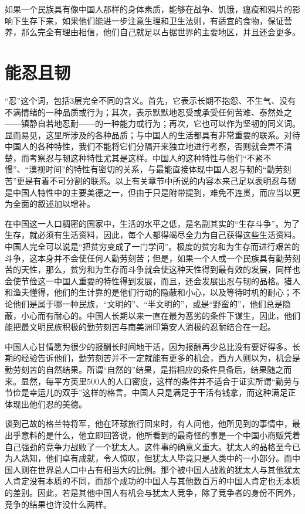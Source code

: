 \documentclass[12pt,oneside]{book}
\begin{document}
\begin{common-format}
如果一个民族具有像中国人那样的身体素质，能够在战争、饥饿，瘟疫和鸦片的影响下生存下来，如果他们能进一步注意生理和卫生法则，有适宜的食物，保证营养，那么完全有理由相信，他们自己就足以占据世界的主要地区，并且还会更多。


\chapter{能忍且韧}
“忍”这个词，包括3层完全不同的含义。首先，它表示长期不抱怨、不生气、没有不满情绪的一种品质或行为；其次，表示默默地忍受或承受任何苦难、泰然处之——镇静自若地忍耐——的一种能力或行为；再次，它也可以作为坚韧的同义词。显而易见，这里所涉及的各种品质；与中国人的生活都具有非常重要的联系。对待中国人的各种特性，我们不能将它们分隔开来独立地进行考察，否则就会弄不清楚，而考察忍与韧这种特性尤其是这样。中国人的这种特性与他们“不紧不慢”、“漠视时间”的特性有密切的关系，与最能直接体现中国人忍与韧的“勤劳刻苦”更是有着不可分割的联系。以上有关章节中所说的内容本来己足以表明忍与韧是中国人特性中的主要美德之一，但由于只是附带提到，难免不连贯，而应当以更为全面的叙述加以增补。 

在中国这一人口稠密的国家中，生活的水平之低，是名副其实的“生存斗争”。为了生存，就必须有生活资料，因此，每个人都得竭尽全力为自己获得这些生活资料。中国人完全可以说是“把贫穷变成了一门学问”。极度的贫穷和为生存而进行艰苦的斗争，这本身并不会使任何人勤劳刻苦；但是，如果一个人或一个民族具有勤劳刻苦的天性，那么，贫穷和为生存而斗争就会使这种天性得到最有效的发展，同样也会使节俭这一中国人重要的特性得到发展，而且，还会发展出忍与韧的品格。猎人和渔夫懂得，他们的生计靠的是他们行动的隐蔽和小心，以及等待时机的耐心；不论他们是属于哪一种民族，“文明的”、“半文明的”，或是“野蛮的”，他们总是隐蔽，小心而有耐心的。中国人长期以来一直在最为恶劣的条件下谋生，因此，他们能把最文明民族积极的勤劳刻苦与南美洲印第安人消极的忍耐结合在一起。 

中国人心甘情愿为很少的报酬长时间地干活，因为报酬再少总比没有要好得多。长期的经验告诉他们，勤劳刻苦并不一定就能有更多的机会，西方人则以为，机会是勤劳刻苦的自然结果。所谓“自然的”结果，是指相应的条件具备后，结果随之而来。显然，每平方英里500人的人口密度，这样的条件并不适合于证实所谓“勤劳与节俭是幸运儿的双手”这样的格言。中国人只是满足于干活有钱拿，而这种满足正体现出他们忍的美德。 

谈到己故的格兰特将军，他在环球旅行回来时，有人问他，他所见到的事情中，最出乎意料的是什么，他立即回答说，他所看到的最奇怪的事是一个中国小商贩凭着自己强劲的竞争力战败了一个犹太人。这件事的确意义重大。犹太人的品格至今已为人熟知，他们卓有成就，令人惊叹，但犹太人毕竟只是人类中的一小部分。而中国人则在世界总人口中占有相当大的比例。那个被中国人战败的犹太人与其他犹太人肯定没有本质的不同，而那个成功的中国人与其他数百万的中国人肯定也无本质的差别。因此，若是其他中国人有机会与犹太人竞争，除了竞争者的身份不同外，竞争的结果也许没什么两样。 


\end{common-format}
\end{document}
